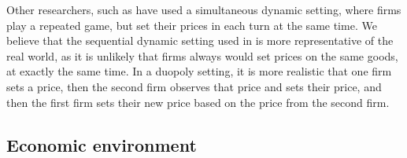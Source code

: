 \documentclass{article}
\begin{document}
Other researchers, such as \cite{Calvano} have used a simultaneous dynamic setting, where firms play a repeated game, but set their prices in each turn at the same time. We believe that the sequential dynamic setting used in \cite{Klein2021} is more representative of the real world, as it is unlikely that firms always would set prices on the same goods, at exactly the same time. In a duopoly setting, it is more realistic that one firm sets a price, then the second firm observes that price and sets their price, and then the first firm sets their new price based on the price from the second firm. 


\subsection{Economic environment}
\end{document}
